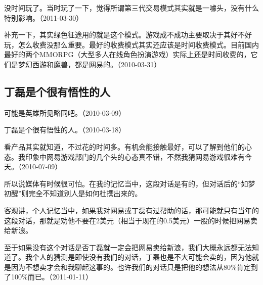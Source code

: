 没时间玩了。当时玩了一下，觉得所谓第三代交易模式其实就是一噱头，没有什么特别影响。（2011-03-30）

补充一下，其实绿色征途用的就是这个模式。游戏成不成功主要取决于其好不好玩，怎么收费没那么重要。最好的收费模式其实还应该是时间收费模式。目前国内最好的两个MMORPG（大型多人在线角色扮演游戏）实际上还是时间收费的，它们是梦幻西游和魔兽，都是网易的。（2010-03-31）

\subsection{丁磊是个很有悟性的人}


可能是英雄所见略同吧。（2010-03-09）


丁磊是个很有悟性的人。（2010-03-18）


看产品其实就知道，不过花的时间多。有机会能接触最好，可以了解到他们的心态。我印象中网易游戏部门的几个头的心态真不错，不然我猜网易游戏很难有今天。（2010-07-09）


所以说媒体有时候很可怕。在我的记忆当中，这段对话是有的，但对话后的“如梦初醒”则完全不知道别人是如何杜撰出来的。

客观讲，个人记忆当中，如果我对网易或丁磊有过帮助的话，那可能就只有当年的这段对话，那就是劝他不要在2美元（相当于现在的0.5美元）一股的时候把网易卖给新浪。

至于如果没有这个对话是否丁磊就一定会把网易卖给新浪，我们大概永远都无法知道了。我个人的猜测是即使没有我们的对话，丁磊也是不大可能会卖的，因为他就是因为不想卖才会和我聊起这事的。也许我们的对话只是把他的想法从80\%肯定到了100\%而已。（2011-01-11）


